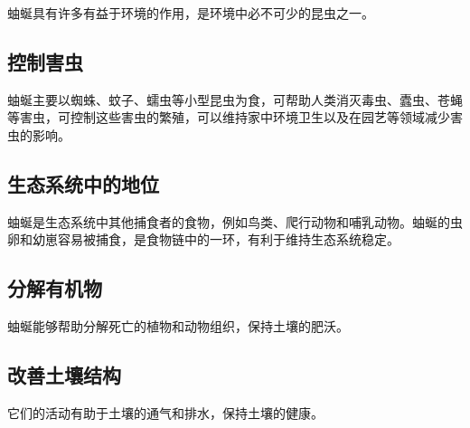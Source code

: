 蚰蜒具有许多有益于环境的作用，是环境中必不可少的昆虫之一。
\subsection{控制害虫}
蚰蜒主要以蜘蛛、蚊子、蠕虫等小型昆虫为食，可帮助人类消灭毒虫、蠹虫、苍蝇等害虫，可控制这些害虫的繁殖，可以维持家中环境卫生以及在园艺等领域减少害虫的影响。
\subsection{生态系统中的地位}
蚰蜒是生态系统中其他捕食者的食物，例如鸟类、爬行动物和哺乳动物。蚰蜒的虫卵和幼崽容易被捕食，是食物链中的一环，有利于维持生态系统稳定。
\subsection{分解有机物}
蚰蜒能够帮助分解死亡的植物和动物组织，保持土壤的肥沃。
\subsection{改善土壤结构}
它们的活动有助于土壤的通气和排水，保持土壤的健康。